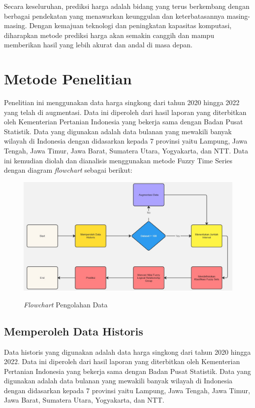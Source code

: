 \documentclass[conference]{IEEEtran}
\begin{document}
Secara keseluruhan, prediksi harga adalah bidang yang terus berkembang dengan berbagai pendekatan yang menawarkan keunggulan dan keterbatasannya masing-masing. Dengan kemajuan teknologi dan peningkatan kapasitas komputasi, diharapkan metode prediksi harga akan semakin canggih dan mampu memberikan hasil yang lebih akurat dan andal di masa depan.



\section{Metode Penelitian}

Penelitian ini menggunakan data harga singkong dari tahun 2020 hingga 2022 yang telah di augmentasi. Data ini diperoleh dari hasil laporan yang diterbitkan oleh Kementerian Pertanian Indonesia yang bekerja sama dengan Badan Pusat Statistik. Data yang digunakan adalah data bulanan yang mewakili banyak wilayah di Indonesia dengan didasarkan kepada 7 provinsi yaitu Lampung, Jawa Tengah, Jawa Timur, Jawa Barat, Sumatera Utara, Yogyakarta, dan NTT. Data ini kemudian diolah dan dianalisis menggunakan metode Fuzzy Time Series dengan diagram \textit{flowchart} sebagai berikut:

\begin{figure}[htbp]
    \centering
    {\includegraphics[scale=0.18]{images/Flowchart.jpg}} 
    \caption{\textit{Flowchart} Pengolahan Data}
\end{figure}


\subsection{Memperoleh Data Historis}
Data historis yang digunakan adalah data harga singkong dari tahun 2020 hingga 2022. Data ini diperoleh dari hasil laporan yang diterbitkan oleh Kementerian Pertanian Indonesia yang bekerja sama dengan Badan Pusat Statistik. Data yang digunakan adalah data bulanan yang mewakili banyak wilayah di Indonesia dengan didasarkan kepada 7 provinsi yaitu Lampung, Jawa Tengah, Jawa Timur, Jawa Barat, Sumatera Utara, Yogyakarta, dan NTT.
\end{document}
